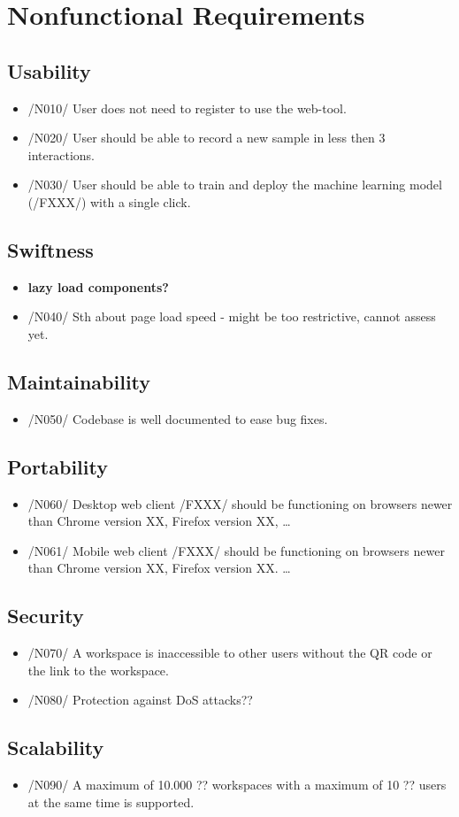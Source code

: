 \section{Nonfunctional Requirements}
\subsection{Usability}
\begin{itemize}
    \item /N010/ User does not need to register to use the web-tool.
    \item /N020/ User should be able to record a new sample in less then 3 interactions. %
    \item /N030/ User should be able to train and deploy the machine learning model (/FXXX/) with a single click. %
\end{itemize}
\subsection{Swiftness}
\begin{itemize}
    \item \textbf{lazy load components?}
    \item /N040/ Sth about page load speed - might be too restrictive, cannot assess yet. %
\end{itemize}
\subsection{Maintainability}
\begin{itemize}
    \item /N050/ Codebase is well documented to ease bug fixes.
\end{itemize}
\subsection{Portability}
\begin{itemize}
    \item /N060/ Desktop web client /FXXX/ should be functioning on browsers newer than Chrome version XX, Firefox version XX, \dots
    \item /N061/ Mobile web client /FXXX/  should be functioning on browsers newer than Chrome version XX, Firefox version XX. \dots
\end{itemize}
\subsection{Security}
\begin{itemize}
    \item /N070/ A workspace is inaccessible to other users without the QR code or the link to the workspace.
    \item /N080/ Protection against DoS attacks??
\end{itemize}
\subsection{Scalability}
\begin{itemize}
    \item /N090/ A maximum of 10.000 ?? workspaces with a maximum of 10 ?? users at the same time is supported. 
\end{itemize}

